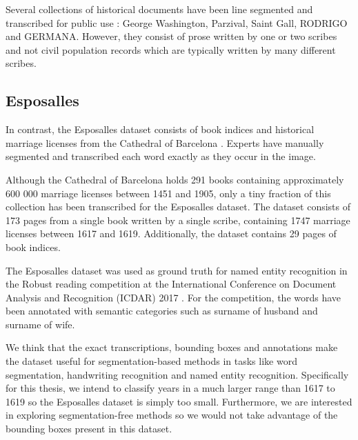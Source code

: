 Several collections of historical documents have been line segmented and transcribed for public use \cite{esposalles}: George Washington, Parzival, Saint Gall, RODRIGO and GERMANA. However, they consist of prose written by one or two scribes and not civil population records which are typically written by many different scribes.

\subsection{Esposalles}
In contrast, the Esposalles dataset consists of book indices and historical marriage licenses from the Cathedral of Barcelona \cite{esposalles}. Experts have manually segmented and transcribed each word exactly as they occur in the image.

Although the Cathedral of Barcelona holds 291 books containing approximately 600 000 marriage licenses between 1451 and 1905, only a tiny fraction of this collection has been transcribed for the Esposalles dataset. The dataset consists of 173 pages from a single book written by a single scribe, containing 1747 marriage licenses between 1617 and 1619. Additionally, the dataset contains 29 pages of book indices.

The Esposalles dataset was used as ground truth for named entity recognition in the Robust reading competition at the International Conference on Document Analysis and Recognition (ICDAR) 2017 \cite{EsposallesCompetition}. For the competition, the words have been annotated with semantic categories such as surname of husband and surname of wife.

We think that the exact transcriptions, bounding boxes and annotations make the dataset useful for segmentation-based methods in tasks like word segmentation, handwriting recognition and named entity recognition.
Specifically for this thesis, we intend to classify years in a much larger range than 1617 to 1619 so the Esposalles dataset is simply too small. Furthermore, we are interested in exploring segmentation-free methods so we would not take advantage of the bounding boxes present in this dataset.




